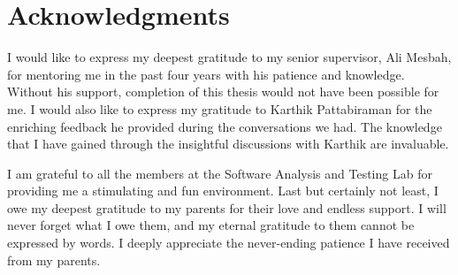
\chapter{Acknowledgments}
I would like to express my deepest gratitude to my senior supervisor, Ali Mesbah,
for mentoring me in the past four years with his patience and knowledge. Without his support, completion of this thesis would not have been possible for me.
I would also like to express my gratitude to Karthik Pattabiraman for the enriching feedback he provided during the conversations we had. The knowledge that I have gained through the insightful
discussions with Karthik are invaluable.

I am grateful to all the members at the Software Analysis and Testing Lab for providing me a stimulating and fun environment. Last but certainly not least, I owe my deepest gratitude to my
parents for their love and endless support. I will never forget what I owe them, and my eternal gratitude to them cannot be expressed by words. I deeply appreciate the never-ending patience I have received from my parents.


